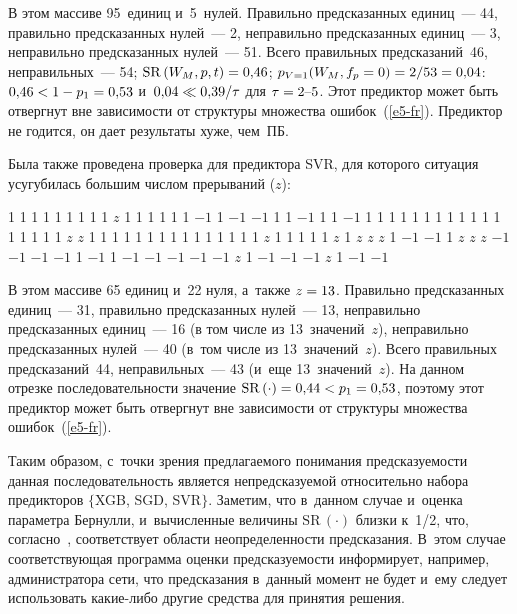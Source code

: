 \begin{multicols}{2}
 \vspace*{2pt}
  
  
  \noindent
  В этом массиве 95~единиц и~5~нулей. Правильно предсказанных 
единиц~--- 44, правильно предсказанных нулей~--- 2, неправильно 
предсказанных единиц~--- 3, неправильно предсказанных нулей~--- 51. Всего 
правильных предсказаний~46, неправильных~--- 54; $\mathrm{SR}\,(W_M, p, 
t) \hm= 0{,}46$; $p_{V=1}(W_M, f_p= 0) \hm= 2/53 \hm= 0{,}04$: $0{,}46\hm< 
1\hm- p_1 \hm= 0{,}53$ и~$0{,}04 \hm\ll 0{,}39/\tau$ для $\tau\hm = 2\mbox{--}5$. 
Этот предиктор может быть отвергнут вне зависимости от структуры 
множества ошибок~(\ref{e5-fr}). Предиктор не годится, он дает результаты 
хуже, чем~ПБ.
  
  Была также проведена проверка для предиктора SVR, для которого 
ситуация усугубилась большим числом прерываний ($z$):

 1 1 1 1 1 1 1 1 1 $z$ 1 1 1 1 1 1 $-1$ 1 $-1$ $-1$
 1 1 $-1$ 1 1 $-1$ 1 1 1 1 1 1 1 1 1 1 1 1 1 1 1
 1 1 $z$ $z$ 1 1 1 1 1 1 1 1 1 1 1 1 1 1 1 $z$ 1
 1 1 1 1 $z$ 1 $z$ $z$ $z$ 1 $-1$ $-1$ 1 $z$ $z$ $z$ $-1$ $-1$ $-1$ $-1$ 1
 $-1$ 1 $-1$ $-1$ $-1$ $-1$ $-1$ $z$ 1 $-1$ $-1$ $-1$ $z$ 1 $-1$ $-1$
 
 \vspace*{2pt}
  
 \noindent
  В этом массиве 65 единиц и~22 нуля, а~также $z \hm= 13$. Правильно 
предсказанных единиц~--- 31, правильно предсказанных нулей~--- 13, 
неправильно предсказанных единиц~--- 16 (в том числе из 13~значений~$z$), 
неправильно предсказанных нулей~--- 40 (в~том числе из 13~значений~$z$). Всего 
правильных предсказаний~44, неправильных~--- 43 (и~еще 13~значений~$z$). 
На данном отрезке последовательности значение 
$\mathrm{SR}\,(\cdot) \hm= 0{,}44\hm< p_1 \hm= 0{,}53$, поэтому этот 
предиктор может быть отвергнут вне зависимости от структуры множества 
ошибок~(\ref{e5-fr}).
   
  Таким образом, с~точки зрения предлагаемого понимания 
предсказуемости данная последовательность является непредсказуемой 
относительно набора предикторов $\{$XGB, SGD, SVR$\}$. Заметим, что 
в~данном случае и~оценка параметра Бернулли, и~вычисленные величины 
$\mathrm{SR}\,(\cdot)$ близки к~1/2, что, согласно~\cite{6-fr}, соответствует 
области не\-опре\-де\-лен\-ности предсказания. В~этом случае соответствующая 
программа оценки предсказуемости информирует, например, 
администратора сети, что предсказания в~данный момент не будет и~ему 
следует использовать ка\-кие-ли\-бо другие средства для принятия решения. 


\end{multicols}
